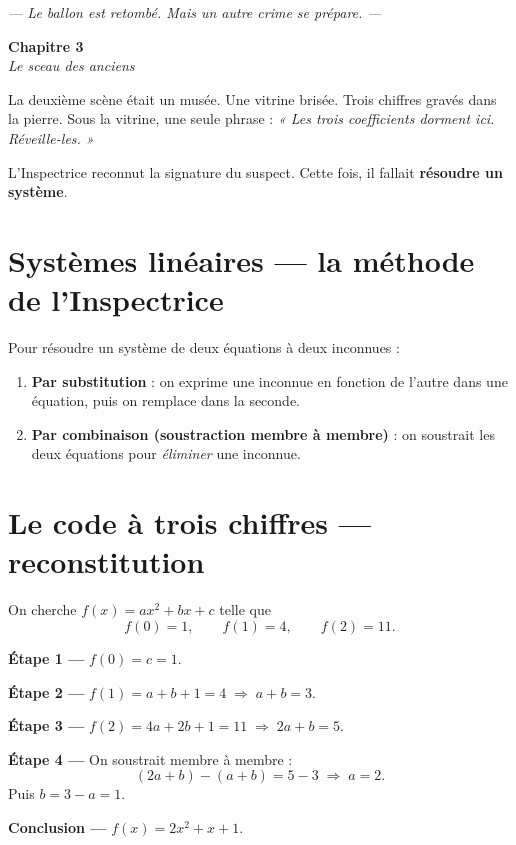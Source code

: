 \documentclass[11pt,a4paper]{article}
\newcommand{\chapterheader}[2]{%
  \clearpage
  \begin{tcolorbox}[
    enhanced,
    colback=ink, colframe=ink,
    interior style={top color=ink, bottom color=charcoal, shading angle=90},
    boxrule=0pt, arc=0pt,
    left=18pt, right=18pt, top=14pt, bottom=14pt,
    width=\textwidth,
  ]
    {\color{white}\Huge\bfseries #1}\\[6pt]
    {\color{silver}\large\itshape #2}
  \end{tcolorbox}
  \vspace{6pt}
}
\begin{document}
\vfill
\begin{center}
\textcolor{slate}{\itshape\small — Le ballon est retombé. Mais un autre crime se prépare. —}
\end{center}

\chapterheader{Chapitre 3}{Le sceau des anciens}

La deuxième scène était un musée. Une vitrine brisée. Trois chiffres gravés dans la pierre. Sous la vitrine, une seule phrase : \emph{« Les trois coefficients dorment ici. Réveille-les. »}

L'Inspectrice reconnut la signature du suspect. Cette fois, il fallait \textbf{résoudre un système}.

\section{Systèmes linéaires — la méthode de l'Inspectrice}

\begin{methode}
Pour résoudre un système de deux équations à deux inconnues :
\begin{enumerate}[leftmargin=*]
  \item \textbf{Par substitution} : on exprime une inconnue en fonction de l'autre dans une équation, puis on remplace dans la seconde.
  \item \textbf{Par combinaison (soustraction membre à membre)} : on soustrait les deux équations pour \emph{éliminer} une inconnue.
\end{enumerate}
\end{methode}

\section{Le code à trois chiffres — reconstitution}

\begin{rapport}
On cherche $f(x) = ax^2+bx+c$ telle que
\[
  f(0) = 1, \qquad f(1) = 4, \qquad f(2) = 11.
\]

\textbf{Étape 1 —} $f(0) = c = 1$.

\textbf{Étape 2 —} $f(1) = a + b + 1 = 4 \;\Rightarrow\; a + b = 3$.

\textbf{Étape 3 —} $f(2) = 4a + 2b + 1 = 11 \;\Rightarrow\; 2a + b = 5$.

\textbf{Étape 4 —} On soustrait membre à membre :
\[
  (2a+b) - (a+b) = 5 - 3 \;\Longrightarrow\; a = 2.
\]
Puis $b = 3 - a = 1$.

\textbf{Conclusion —} $f(x) = 2x^2 + x + 1$.
\end{rapport}
\end{document}
